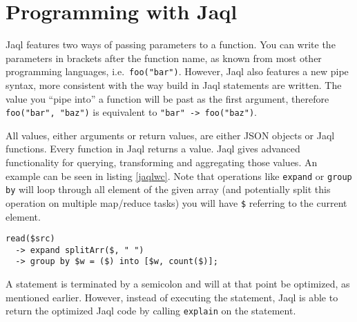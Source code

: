 \section{Programming with Jaql} 

Jaql features two ways of passing parameters to a function. You can write the parameters
in brackets after the function name, as known from most other programming languages, i.e.\
\lstinline[language=jaql]!foo("bar")!. However, Jaql also features a new pipe syntax, more
consistent with the way build in Jaql statements are written. The value you ``pipe into''
a function will be past as the first argument, therefore \lstinline[language=jaql]!foo("bar", "baz")!
is equivalent to \lstinline[language=jaql]!"bar" -> foo("baz")!.

All values, either arguments or return values, are either JSON objects or Jaql functions.
Every function in Jaql returns a value. Jaql gives advanced functionality for querying, transforming
and aggregating those values. An example can be seen in listing \ref{jaqlwc}. Note that
operations like {\tt expand} or {\tt group by} will loop through all element of the given array
(and potentially split this operation on multiple map/reduce tasks) you will have {\tt\$} referring
to the current element.

\begin{lstlisting}[language=jaql,caption=Wordcount in Jaql,label=jaqlwc]
read($src)
  -> expand splitArr($, " ")
  -> group by $w = ($) into [$w, count($)];
\end{lstlisting}

A statement is terminated by a semicolon and will at that point be optimized, as mentioned earlier.
However, instead of executing the statement, Jaql is able to return the optimized Jaql code by calling
{\tt explain} on the statement.